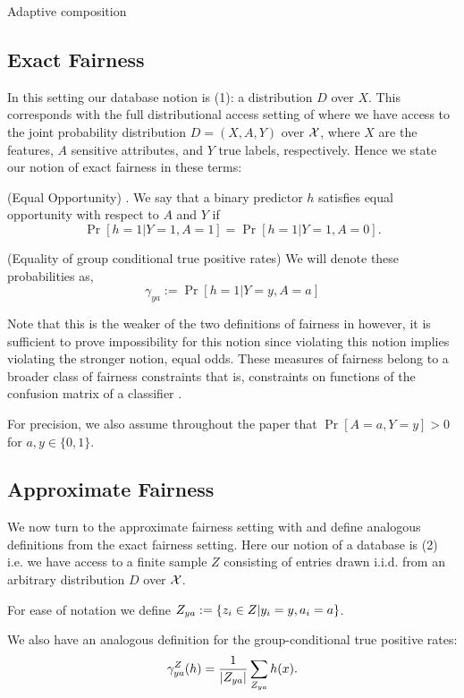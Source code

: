 \begin{theorem} Adaptive composition
\end{theorem}

\subsection{Exact Fairness}

In this setting our database notion is (1): a distribution $D$ over
$X$. This corresponds with the full distributional access setting of
\cite{hardteqop} where we have access to the joint probability
distribution $D = (X, A, Y)$ over $\mathcal{X}$, where $X$ are the features, $A$
sensitive attributes, and $Y$ true labels, respectively. Hence we state
our notion of exact fairness in these terms:

\begin{defn}
  (Equal Opportunity) \cite{hardteqop}. We say that a binary predictor $h$ satisfies
    equal opportunity with respect to $A$ and $Y$ if
    $$\Pr[h = 1 | Y=1, A=1] = \Pr[h = 1 | Y=1, A=0].$$

   	(Equality of group conditional true positive rates) We will denote these probabilities as,
   	$$\gamma_{ya} := \Pr[h = 1 | Y=y, A=a]$$
\end{defn}

Note that this is the weaker of the two definitions of fairness in
\citet{hardteqop} however, it is sufficient to prove impossibility for this
notion since violating this notion implies violating the stronger
notion, equal odds. These measures of fairness belong to a broader
class of fairness constraints that is, constraints on functions of the
confusion matrix of a classifier .

For precision, we also assume throughout the paper that $\Pr[A=a, Y=y] >0$ for $a,y \in \{0,1\}$.

\subsection{Approximate Fairness}
We now turn to the approximate fairness setting with and define
analogous definitions from the exact fairness setting. Here our notion
of a database is (2) i.e. we have access to a finite sample $Z$
consisting of entries drawn i.i.d. from an arbitrary distribution $D$
over $\mathcal{X}$.

For ease of notation we define $Z_{ya} := \{z_i \in Z | y_i = y, a_i = a \}$.

We also have an analogous definition for the group-conditional true
positive rates: 
$$\gamma_{ya}^Z(h) = \frac{1}{|Z_{ya}|} \sum_{Z_{ya}} h(x).$$

